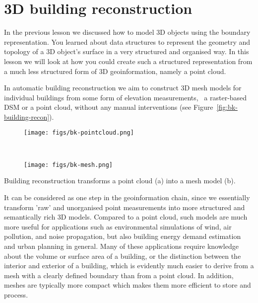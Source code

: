 
\setchapterpreamble[u]{\margintoc}

\graphicspath{{LoD2recon/}}
\renewcommand*{\thelesson}{2.2}

\chapter{3D building reconstruction}%
\label{chap:LoD2recon}

In the previous lesson we discussed how to model 3D objects using the boundary representation.
You learned about data structures to represent the geometry and topology of a 3D object's surface in a very structured and organised way.
In this lesson we will look at how you could create such a structured representation from a much less structured form of 3D geoinformation, namely a point cloud.

In automatic building reconstruction we aim to construct 3D mesh models for individual buildings from some form of elevation measurements, \ie\ a raster-based DSM or a point cloud, without any manual interventions (see Figure~\ref{fig:bk-building-recon}).
\begin{marginfigure}
	\centering
	\begin{subfigure}{\linewidth}
		\texttt{[image: figs/bk-pointcloud.png]}
		\caption{}%
		\label{subfig:bk-pc}
	\end{subfigure}
\\
	\begin{subfigure}{\linewidth}
		\texttt{[image: figs/bk-mesh.png]}
		\caption{}%
		\label{subfig:bk-mesh}
	\end{subfigure}
	\caption{Building reconstruction transforms a point cloud (a) into a mesh model (b).}%
	\label{fig:bk-building-recon}
\end{marginfigure}
It can be considered as one step in the geoinformation chain, since we essentially transform 'raw' and unorganised point measurements into more structured and semantically rich 3D models.
Compared to a point cloud, such models are much more useful for applications such as environmental simulations of wind, air pollution, and noise propagation, but also building energy demand estimation and urban planning in general.
Many of these applications require knowledge about the volume or surface area of a building, or the distinction between the interior and exterior of a building, which is evidently much easier to derive from a mesh with a clearly defined boundary than from a point cloud.
In addition, meshes are typically more compact which makes them more efficient to store and process.

